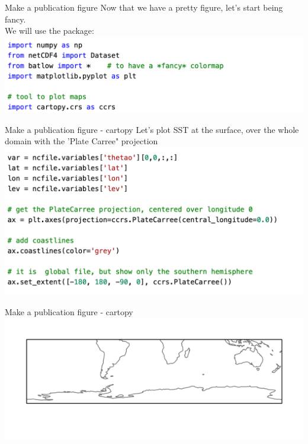 
\begin{frame}{\insertsectionnumber{ |} Make a publication figure}
    Now that we have a pretty figure, let's start being fancy.\\
        \vspace{0.3cm}
    We will use the \href{https://scitools.org.uk/cartopy/docs/latest/}{} package:\\
    \includegraphics[scale=0.35]{images/Script4_step1.png}
\end{frame}


\begin{frame}{\insertsectionnumber{ |} Make a publication figure - cartopy}
    Let's plot SST at the surface, over the whole domain with the 'Plate Carree" projection
        \includegraphics[scale=0.35]{images/Script4_step2.png}
\end{frame}
  
  
\begin{frame}{\insertsectionnumber{ |} Make a publication figure - cartopy} 
    \includegraphics[scale=0.50]{images/script2_fig1.png}
\end{frame}


